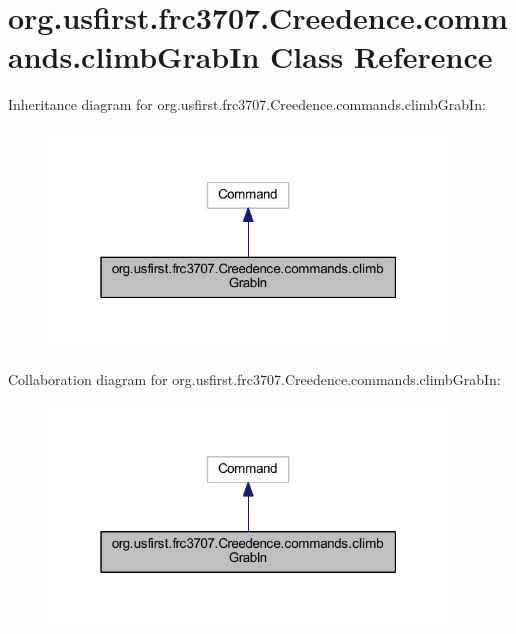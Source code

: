 \hypertarget{classorg_1_1usfirst_1_1frc3707_1_1_creedence_1_1commands_1_1climb_grab_in}{}\section{org.\+usfirst.\+frc3707.\+Creedence.\+commands.\+climb\+Grab\+In Class Reference}
\label{classorg_1_1usfirst_1_1frc3707_1_1_creedence_1_1commands_1_1climb_grab_in}


Inheritance diagram for org.\+usfirst.\+frc3707.\+Creedence.\+commands.\+climb\+Grab\+In\+:
\nopagebreak
\begin{figure}[H]
\begin{center}
\leavevmode
\includegraphics[width=301pt]{classorg_1_1usfirst_1_1frc3707_1_1_creedence_1_1commands_1_1climb_grab_in__inherit__graph}
\end{center}
\end{figure}


Collaboration diagram for org.\+usfirst.\+frc3707.\+Creedence.\+commands.\+climb\+Grab\+In\+:
\nopagebreak
\begin{figure}[H]
\begin{center}
\leavevmode
\includegraphics[width=301pt]{classorg_1_1usfirst_1_1frc3707_1_1_creedence_1_1commands_1_1climb_grab_in__coll__graph}
\end{center}
\end{figure}
